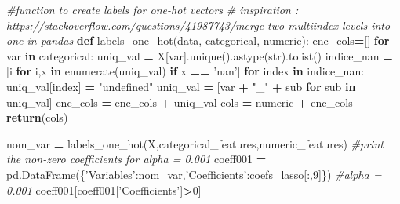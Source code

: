 \documentclass[10pt,a4paper]{article}
\newenvironment{Shaded}{\begin{snugshade}}{\end{snugshade}}
\newcommand{\BuiltInTok}[1]{#1}
\newcommand{\CommentTok}[1]{\textcolor[rgb]{0.56,0.35,0.01}{\textit{#1}}}
\newcommand{\ControlFlowTok}[1]{\textcolor[rgb]{0.13,0.29,0.53}{\textbf{#1}}}
\newcommand{\DecValTok}[1]{\textcolor[rgb]{0.00,0.00,0.81}{#1}}
\newcommand{\KeywordTok}[1]{\textcolor[rgb]{0.13,0.29,0.53}{\textbf{#1}}}
\newcommand{\NormalTok}[1]{#1}
\newcommand{\OperatorTok}[1]{\textcolor[rgb]{0.81,0.36,0.00}{\textbf{#1}}}
\newcommand{\StringTok}[1]{\textcolor[rgb]{0.31,0.60,0.02}{#1}}
\theoremstyle{break}
\begin{document}
\begin{Shaded}
\begin{Highlighting}[]
\CommentTok{#function to create labels for one-hot vectors}
\CommentTok{# inspiration : https://stackoverflow.com/questions/41987743/merge-two-multiindex-levels-into-one-in-pandas}
\KeywordTok{def}\NormalTok{ labels_one_hot(data, categorical, numeric):}
\NormalTok{    enc_cols}\OperatorTok{=}\NormalTok{[]}
    \ControlFlowTok{for}\NormalTok{ var }\KeywordTok{in}\NormalTok{ categorical:}
\NormalTok{        uniq_val }\OperatorTok{=}\NormalTok{ X[var].unique().astype(}\BuiltInTok{str}\NormalTok{).tolist()}
\NormalTok{        indice_nan }\OperatorTok{=}\NormalTok{ [i }\ControlFlowTok{for}\NormalTok{ i,x }\KeywordTok{in} \BuiltInTok{enumerate}\NormalTok{(uniq_val) }\ControlFlowTok{if}\NormalTok{ x }\OperatorTok{==} \StringTok{'nan'}\NormalTok{]}
        \ControlFlowTok{for}\NormalTok{ index }\KeywordTok{in}\NormalTok{ indice_nan:}
\NormalTok{            uniq_val[index] }\OperatorTok{=} \StringTok{"undefined"}
\NormalTok{        uniq_val }\OperatorTok{=}\NormalTok{ [var }\OperatorTok{+} \StringTok{"_"} \OperatorTok{+}\NormalTok{ sub }\ControlFlowTok{for}\NormalTok{ sub }\KeywordTok{in}\NormalTok{ uniq_val] }
\NormalTok{        enc_cols }\OperatorTok{=}\NormalTok{ enc_cols }\OperatorTok{+}\NormalTok{ uniq_val}
\NormalTok{    cols }\OperatorTok{=}\NormalTok{ numeric }\OperatorTok{+}\NormalTok{ enc_cols}
    \ControlFlowTok{return}\NormalTok{(cols)}
\end{Highlighting}
\end{Shaded}

\begin{Shaded}
\begin{Highlighting}[]
\NormalTok{nom_var }\OperatorTok{=}\NormalTok{ labels_one_hot(X,categorical_features,numeric_features)}
\CommentTok{#print the non-zero coefficients for alpha = 0.001}
\NormalTok{coeff001 }\OperatorTok{=}\NormalTok{ pd.DataFrame(\{}\StringTok{'Variables'}\NormalTok{:nom_var,}\StringTok{'Coefficients'}\NormalTok{:coefs_lasso[:,}\DecValTok{9}\NormalTok{]\}) }\CommentTok{#alpha = 0.001}
\NormalTok{coeff001[coeff001[}\StringTok{'Coefficients'}\NormalTok{]}\OperatorTok{>}\DecValTok{0}\NormalTok{]}
\end{Highlighting}
\end{Shaded}
\end{document}
